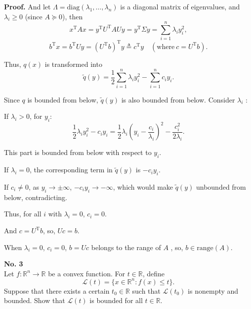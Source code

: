 \documentclass[a4paper, 11pt]{article}
\newenvironment{problem}[2][No.]
    { \begin{mdframed}[backgroundcolor=gray!5] \textbf{#1 #2} \\}
    {  \end{mdframed}}
\newenvironment{solution}
    {\textbf{Proof.}}
    {}
\begin{document}
\begin{solution}
And let \( \Lambda = \text{diag}(\lambda_1, \ldots, \lambda_n) \) is a diagonal matrix of eigenvalues, and \( \lambda_i \geq 0 \) (since \( A \succeq 0 \)), then
$$
x^{\mathrm{T}}Ax = y^{\mathrm{T}}U^{\mathrm{T}}AUy = y^{\mathrm{T}}\Sigma y = \sum_{i=1}^n \lambda_i y_i^2,
$$ 
$$
b^{\mathrm{T}}x = b^{\mathrm{T}}Uy = (U^{\mathrm{T}}b)^{\mathrm{T}}y \triangleq c^{\mathrm{T}}y \quad (\text{where} \ c = U^{\mathrm{T}}b).
$$ 

Thus, \( q(x) \) is transformed into  
$$
\tilde{q}(y) = \frac{1}{2} \sum_{i=1}^n \lambda_i y_i^2 - \sum_{i=1}^n c_i y_i.
$$

Since \( q \) is bounded from below, \( \tilde{q}(y) \) is also bounded from below. Consider \( \lambda_i \) :  


If \( \lambda_i > 0 \), for \( y_i \):  
$$
	\frac{1}{2}\lambda_i y_i^2 - c_i y_i = \frac{1}{2}\lambda_i \left( y_i - \frac{c_i}{\lambda_i} \right)^2 - \frac{c_i^2}{2\lambda_i}.
$$

This part is bounded from below with respect to \( y_i \).  
	
If \( \lambda_i = 0 \), the corresponding term in \( \tilde{q}(y) \) is \( -c_i y_i \). 

If \( c_i \neq 0 \), as \( y_i \to \pm\infty \), \( -c_i y_i \to -\infty \), which would make \( \tilde{q}(y) \) unbounded from below, contradicting. 

Thus, for all \( i \) with \( \lambda_i = 0 \),  \( c_i = 0 \). 
	 
And \( c = U^{\mathrm{T}} b \), so, \( Uc = b \). 

When \( \lambda_i = 0 \), \( c_i = 0 \), \( b = Uc \) belongs to the range of \( A \) , so, \( b \in \text{range}(A) \). 

\end{solution}


\begin{problem}{3}
	Let \( f : \mathbb{R}^n \to \mathbb{R} \) be a convex function. For \( t \in \mathbb{R} \), define
$$
	\mathcal{L}(t) = \{ x \in \mathbb{R}^n : f(x) \leq t \}.
$$
	Suppose that there exists a certain \( t_0 \in \mathbb{R} \) such that \( \mathcal{L}(t_0) \) is nonempty and bounded. Show that \( \mathcal{L}(t) \) is bounded for all \( t \in \mathbb{R} \).
\end{problem}
\end{document}
